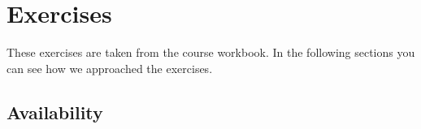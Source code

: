 \section{Exercises}

These exercises are taken from the course workbook. In the following sections you can see how we approached the exercises.

\subsection{Availability}